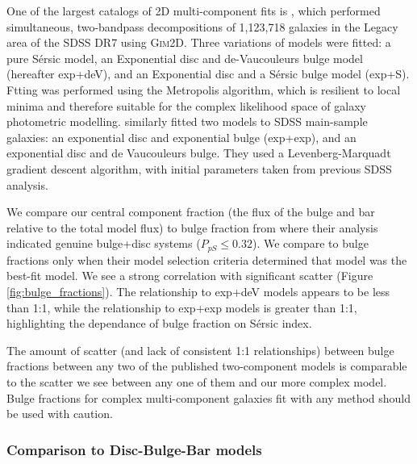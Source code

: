 \documentclass[../main.tex]{subfiles}
\begin{document}
One of the largest catalogs of 2D multi-component fits is \citet{2011ApJS..196...11S}, which performed simultaneous, two-bandpass decompositions of 1,123,718 galaxies in the Legacy area of the SDSS DR7 using \textsc{Gim2D}. Three variations of models were fitted: a pure S\'ersic model, an Exponential disc and de-Vaucouleurs bulge model (hereafter exp+deV), and an Exponential disc and a S\'ersic bulge model (exp+S). Ftting was performed using the Metropolis algorithm, which is resilient to local minima and therefore suitable for the complex likelihood space of galaxy photometric modelling. \citet{2012MNRAS.421.2277L} similarly fitted two models to SDSS main-sample galaxies: an exponential disc and exponential bulge (exp+exp), and an exponential disc and de Vaucouleurs bulge. They used a Levenberg-Marquadt gradient descent algorithm, with initial parameters taken from previous SDSS analysis.

We compare our central component fraction (the flux of the bulge and bar relative to the total model flux) to bulge fraction from \citet{2011ApJS..196...11S} where their analysis indicated genuine bulge+disc systems ($P_{pS} \le 0.32$). We compare to \citet{2012MNRAS.421.2277L} bulge fractions only when their model selection criteria determined that model was the best-fit model. We see a strong correlation with significant scatter (Figure \ref{fig:bulge_fractions}). The relationship to exp+deV models appears to be less than 1:1, while the relationship to exp+exp models is greater than 1:1, highlighting the dependance of bulge fraction on S\'ersic index.

The amount of scatter (and lack of consistent 1:1 relationships) between bulge fractions between any two of the published two-component models is comparable to the scatter we see between any one of them and our more complex model. Bulge fractions for complex multi-component galaxies fit with any method should be used with caution.

\begin{figure*}
  \caption{Scatter plots comparing the ratio of flux from central components (bulge and bar) to the total flux between fitted models from \textit{Galaxy Builder} and two-component models in the literature.}
  \label{fig:bulge_fractions}
\end{figure*}


\subsubsection{Comparison to Disc-Bulge-Bar models}
\end{document}
